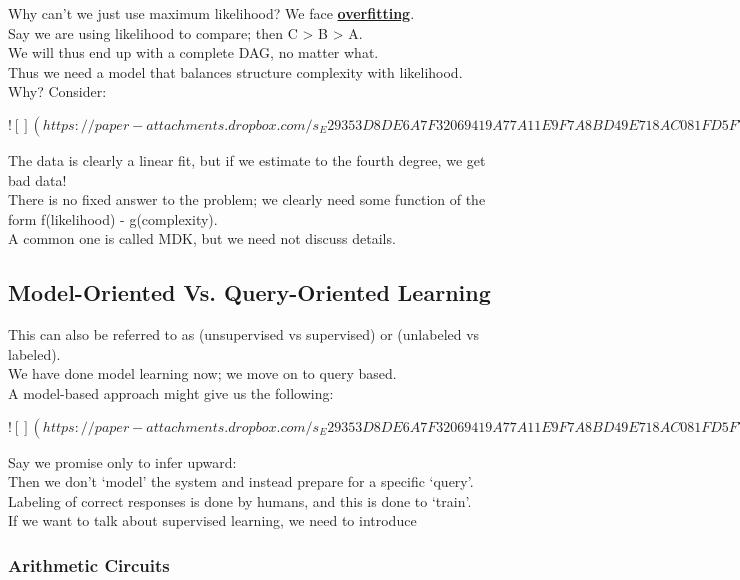 \documentclass[../../lecture_notes.tex]{subfiles}
\begin{document}
\noindent Why can’t we just use maximum likelihood? We face \textbf{\underline{overfitting}}.\\
Say we are using likelihood to compare; then C > B > A.\\
	\indent We will thus end up with a complete DAG, no matter what.\\
	\indent Thus we need a model that balances structure complexity with likelihood.\\
	\indent Why? Consider:

\newpage
$![](https://paper-attachments.dropbox.com/s_E29353D8DE6A7F32069419A77A11E9F7A8BD49E718AC081FD5F77701FB86FF68_1590909021630_Untitled+drawing+5.jpg)$
\newpage

\noindent The data is clearly a linear fit, but if we estimate to the fourth degree, we get bad data!\\
There is no fixed answer to the problem; we clearly need some function of the form f(likelihood) - g(complexity).\\
A common one is called MDK, but we need not discuss details.\\

\subsection*{Model-Oriented Vs. Query-Oriented Learning}
\noindent This can also be referred to as (unsupervised vs supervised) or (unlabeled vs labeled).\\
We have done model learning now; we move on to query based.\\
	\indent A model-based approach might give us the following:

\newpage
$![](https://paper-attachments.dropbox.com/s_E29353D8DE6A7F32069419A77A11E9F7A8BD49E718AC081FD5F77701FB86FF68_1590909614270_Untitled+drawing+6.jpg)$
\newpage

\noindent Say we promise only to infer upward:\\
	\indent  Then we don’t ‘model’ the system and instead prepare for a specific ‘query’.\\
	\indent Labeling of correct responses is done by humans, and this is done to ‘train’.\\
	\indent If we want to talk about supervised learning, we need to introduce

\subsubsection*{Arithmetic Circuits}
\end{document}
